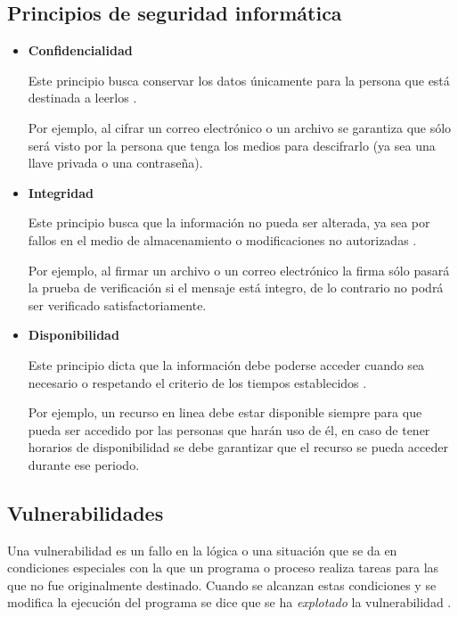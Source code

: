   \subsection {Principios de seguridad inform\'{a}tica}

\begin{itemize}

  \item \textbf{Confidencialidad}

Este principio busca conservar los datos \'{u}nicamente para la persona que est\'{a} destinada a leerlos \cite{_nist_????}\cite{_information_????}.

Por ejemplo, al cifrar un correo electr\'{o}nico o un archivo se garantiza que s\'{o}lo ser\'{a} visto por la persona que tenga los medios para descifrarlo (ya sea una llave privada o una contrase\~{n}a).

  \item \textbf{Integridad}

Este principio busca que la informaci\'{o}n no pueda ser alterada, ya sea por fallos en el medio de almacenamiento o modificaciones no autorizadas \cite{_nist_????}\cite{_information_????}.

Por ejemplo, al firmar un archivo o un correo electr\'{o}nico la firma s\'{o}lo pasar\'{a} la prueba de verificaci\'{o}n si el mensaje est\'{a} integro, de lo contrario no podr\'{a} ser verificado satisfactoriamente.

  \item \textbf{Disponibilidad}

Este principio dicta que la informaci\'{o}n debe poderse acceder cuando sea necesario o respetando el criterio de los tiempos establecidos \cite{_nist_????}\cite{_information_????}.

Por ejemplo, un recurso en linea debe estar disponible siempre para que pueda ser accedido por las personas que har\'{a}n uso de \'{e}l, en caso de tener horarios de disponibilidad se debe garantizar que el recurso se pueda acceder durante ese periodo.

\end{itemize}

  \subsection {Vulnerabilidades}

Una vulnerabilidad es un fallo en la l\'{o}gica o una situaci\'{o}n que se da en condiciones especiales con la que un programa o proceso realiza tareas para las que no fue originalmente destinado. Cuando se alcanzan estas condiciones y se modifica la ejecuci\'{o}n del programa se dice que se ha \textit{explotado} la vulnerabilidad \cite{padilla_buenas_2009}.

